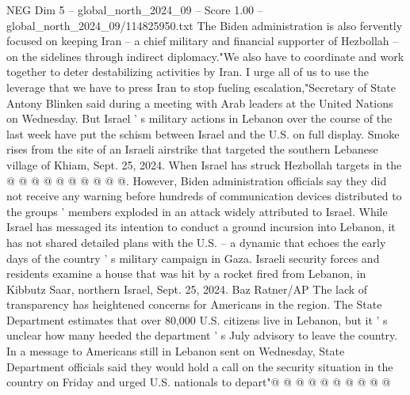 \begin{textsample}{NEG Dim 5 – global\_north\_2024\_09 – Score 1.00 – global\_north\_2024\_09/114825950.txt}
The Biden administration is also fervently focused on keeping Iran -- a chief military and financial supporter of Hezbollah -- on the sidelines through indirect diplomacy."We also have to coordinate and work together to deter destabilizing activities by Iran.
I urge all of us to use the leverage that we have to press Iran to stop fueling escalation,"Secretary of State Antony Blinken said during a meeting with Arab leaders at the United Nations on Wednesday.
But Israel ' s military actions in Lebanon over the course of the last week have put the schism between Israel and the U.S. on full display.
Smoke rises from the site of an Israeli airstrike that targeted the southern Lebanese village of Khiam, Sept. 25, 2024.
When Israel has struck Hezbollah targets in the @ @ @ @ @ @ @ @ @ @.
However, Biden administration officials say they did not receive any warning before hundreds of communication devices distributed to the groups ' members exploded in an attack widely attributed to Israel.
While Israel has messaged its intention to conduct a ground incursion into Lebanon, it has not shared detailed plans with the U.S. -- a dynamic that echoes the early days of the country ' s military campaign in Gaza.
Israeli security forces and residents examine a house that was hit by a rocket fired from Lebanon, in Kibbutz Saar, northern Israel, Sept. 25, 2024.
Baz Ratner/AP The lack of transparency has heightened concerns for Americans in the region.
The State Department estimates that over 80,000 U.S. citizens live in Lebanon, but it ' s unclear how many heeded the department ' s July advisory to leave the country.
In a message to Americans still in Lebanon sent on Wednesday, State Department officials said they would hold a call on the security situation in the country on Friday and urged U.S. nationals to depart"@ @ @ @ @ @ @ @ @ @

\end{textsample}
